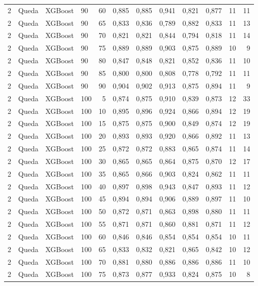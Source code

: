 \begin{longtable}{ccclrrrrrrrr}
2 & Queda & XGBoost & 90 & 60 & 0,885 & 0,885 & 0,941 & 0,821 & 0,877 & 11 & 11 \\
2 & Queda & XGBoost & 90 & 65 & 0,833 & 0,836 & 0,789 & 0,882 & 0,833 & 11 & 13 \\
2 & Queda & XGBoost & 90 & 70 & 0,821 & 0,821 & 0,844 & 0,794 & 0,818 & 11 & 14 \\
2 & Queda & XGBoost & 90 & 75 & 0,889 & 0,889 & 0,903 & 0,875 & 0,889 & 10 & 9 \\
2 & Queda & XGBoost & 90 & 80 & 0,847 & 0,848 & 0,821 & 0,852 & 0,836 & 11 & 10 \\
2 & Queda & XGBoost & 90 & 85 & 0,800 & 0,800 & 0,808 & 0,778 & 0,792 & 11 & 11 \\
2 & Queda & XGBoost & 90 & 90 & 0,904 & 0,902 & 0,913 & 0,875 & 0,894 & 11 & 9 \\
2 & Queda & XGBoost & 100 & 5 & 0,874 & 0,875 & 0,910 & 0,839 & 0,873 & 12 & 33 \\
2 & Queda & XGBoost & 100 & 10 & 0,895 & 0,896 & 0,924 & 0,866 & 0,894 & 12 & 19 \\
2 & Queda & XGBoost & 100 & 15 & 0,875 & 0,875 & 0,900 & 0,849 & 0,874 & 12 & 19 \\
2 & Queda & XGBoost & 100 & 20 & 0,893 & 0,893 & 0,920 & 0,866 & 0,892 & 11 & 13 \\
2 & Queda & XGBoost & 100 & 25 & 0,872 & 0,872 & 0,883 & 0,865 & 0,874 & 11 & 14 \\
2 & Queda & XGBoost & 100 & 30 & 0,865 & 0,865 & 0,864 & 0,875 & 0,870 & 12 & 17 \\
2 & Queda & XGBoost & 100 & 35 & 0,865 & 0,866 & 0,903 & 0,824 & 0,862 & 11 & 11 \\
2 & Queda & XGBoost & 100 & 40 & 0,897 & 0,898 & 0,943 & 0,847 & 0,893 & 11 & 12 \\
2 & Queda & XGBoost & 100 & 45 & 0,894 & 0,894 & 0,906 & 0,889 & 0,897 & 11 & 10 \\
2 & Queda & XGBoost & 100 & 50 & 0,872 & 0,871 & 0,863 & 0,898 & 0,880 & 11 & 11 \\
2 & Queda & XGBoost & 100 & 55 & 0,871 & 0,871 & 0,860 & 0,881 & 0,871 & 11 & 12 \\
2 & Queda & XGBoost & 100 & 60 & 0,846 & 0,846 & 0,854 & 0,854 & 0,854 & 10 & 11 \\
2 & Queda & XGBoost & 100 & 65 & 0,833 & 0,832 & 0,821 & 0,865 & 0,842 & 10 & 12 \\
2 & Queda & XGBoost & 100 & 70 & 0,881 & 0,880 & 0,886 & 0,886 & 0,886 & 11 & 10 \\
2 & Queda & XGBoost & 100 & 75 & 0,873 & 0,877 & 0,933 & 0,824 & 0,875 & 10 & 8 \\

\end{longtable}
